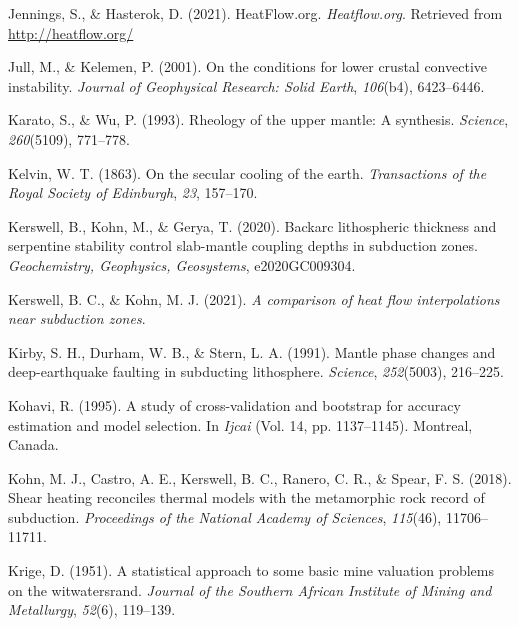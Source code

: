 \begin{CSLReferences}{1}{1}
\leavevmode{}%
Jennings, S., \& Hasterok, D. (2021). HeatFlow.org. \emph{Heatflow.org}. Retrieved from \url{http://heatflow.org/}

\leavevmode{}%
Jull, M., \& Kelemen, P. (2001). On the conditions for lower crustal convective instability. \emph{Journal of Geophysical Research: Solid Earth}, \emph{106}(b4), 6423--6446.

\leavevmode{}%
Karato, S., \& Wu, P. (1993). Rheology of the upper mantle: A synthesis. \emph{Science}, \emph{260}(5109), 771--778.

\leavevmode{}%
Kelvin, W. T. (1863). On the secular cooling of the earth. \emph{Transactions of the Royal Society of Edinburgh}, \emph{23}, 157--170.

\leavevmode{}%
Kerswell, B., Kohn, M., \& Gerya, T. (2020). Backarc lithospheric thickness and serpentine stability control slab-mantle coupling depths in subduction zones. \emph{Geochemistry, Geophysics, Geosystems}, e2020GC009304.

\leavevmode{}%
Kerswell, B. C., \& Kohn, M. J. (2021). \emph{A comparison of heat flow interpolations near subduction zones}.

\leavevmode{}%
Kirby, S. H., Durham, W. B., \& Stern, L. A. (1991). Mantle phase changes and deep-earthquake faulting in subducting lithosphere. \emph{Science}, \emph{252}(5003), 216--225.

\leavevmode{}%
Kohavi, R. (1995). A study of cross-validation and bootstrap for accuracy estimation and model selection. In \emph{Ijcai} (Vol. 14, pp. 1137--1145). Montreal, Canada.

\leavevmode{}%
Kohn, M. J., Castro, A. E., Kerswell, B. C., Ranero, C. R., \& Spear, F. S. (2018). Shear heating reconciles thermal models with the metamorphic rock record of subduction. \emph{Proceedings of the National Academy of Sciences}, \emph{115}(46), 11706--11711.

\leavevmode{}%
Krige, D. (1951). A statistical approach to some basic mine valuation problems on the witwatersrand. \emph{Journal of the Southern African Institute of Mining and Metallurgy}, \emph{52}(6), 119--139.


\end{CSLReferences}
